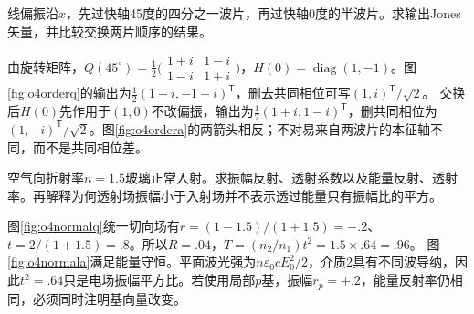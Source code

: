 \begin{exercise}\label{ex:o4plateorder}
线偏振沿$x$，先过快轴45度的四分之一波片，再过快轴0度的半波片。求输出Jones矢量，并比较交换两片顺序的结果。
\end{exercise}
\begin{solution}
由旋转矩阵，$Q(45^\circ)=\tfrac12\bigl(\begin{smallmatrix}1+i&1-i\\1-i&1+i\end{smallmatrix}\bigr)$，$H(0)=\operatorname{diag}(1,-1)$。图\ref{fig:o4orderq}的输出为$\tfrac12(1+i,-1+i)^{\mathsf T}$，删去共同相位可写$(1,i)^{\mathsf T}/\sqrt2$。
交换后$H(0)$先作用于$(1,0)$不改偏振，输出为$\tfrac12(1+i,1-i)^{\mathsf T}$，删共同相位为$(1,-i)^{\mathsf T}/\sqrt2$。图\ref{fig:o4ordera}的两箭头相反；不对易来自两波片的本征轴不同，而不是共同相位差。
\end{solution}

\begin{exercise}\label{ex:o4normalenergy}
空气向折射率$n=1.5$玻璃正常入射。求振幅反射、透射系数以及能量反射、透射率。再解释为何透射场振幅小于入射场并不表示透过能量只有振幅比的平方。
\end{exercise}
\begin{solution}
图\ref{fig:o4normalq}统一切向场有$r=(1-1.5)/(1+1.5)=-.2$、$t=2/(1+1.5)=.8$。所以$R=.04$，$T=(n_2/n_1)t^2=1.5\times.64=.96$。
图\ref{fig:o4normala}满足能量守恒。平面波光强为$n\varepsilon_0cE_0^2/2$，介质2具有不同波导纳，因此$t^2=.64$只是电场振幅平方比。若使用局部$p$基，振幅$r_p=+.2$，能量反射率仍相同，必须同时注明基向量改变。
\end{solution}

